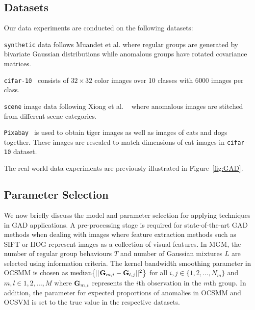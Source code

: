 \subsection{Datasets}
Our data experiments are conducted on the following datasets: %
\begin{itemize}
{  \item {\tt synthetic} data follows Muandet et al. \cite{OCSMM} where regular groups are generated by bivariate Gaussian distributions while anomalous groups have  rotated covariance matrices. }
	\item {\tt cifar-10}~\cite{krizhevsky2009learning} consists of $32\times32$ color images over 10 classes with 6000 images per class.
    \item {\tt scene} image data following Xiong et al. ~\cite{FGM} where anomalous images are stitched from different scene categories.
 {  \item {\tt Pixabay}~\cite{pixabayImages} is used to obtain tiger images as well as images of cats and dogs together. These images are  rescaled to match dimensions of cat images in {\tt cifar-10} dataset. 
 }
 \end{itemize} 
The real-world data experiments %
are previously illustrated in Figure~\ref{fig:GAD}. 
 
 

\subsection{Parameter Selection} 
We now briefly discuss the model and parameter selection for applying techniques in GAD applications.  A pre-processing stage is required for state-of-the-art GAD methods when dealing with images %
where feature extraction methods such as SIFT \cite{sift} or HOG \cite{hog}  represent images as a collection of visual features. %
In MGM, the number of regular group behaviours $T$ and number of Gaussian mixtures $L$ are selected using information criteria.  The kernel bandwidth smoothing parameter  in OCSMM \cite{OCSMM} is chosen as $  \mbox{median}\big\{ || {\bf G}_{m,i} -{\bf G}_{l,j} ||^2 \big\} $ for all $i,j \in \{1,2,\dots,N_m \}$ and $m,l \in {1,2,\dots,M}$ where $ {\bf G}_{m,i} $ represents the $i$th observation in the $m$th group.  In addition, the parameter for expected  proportions of anomalies in  OCSMM and OCSVM is set to the true value in the respective datasets. 


